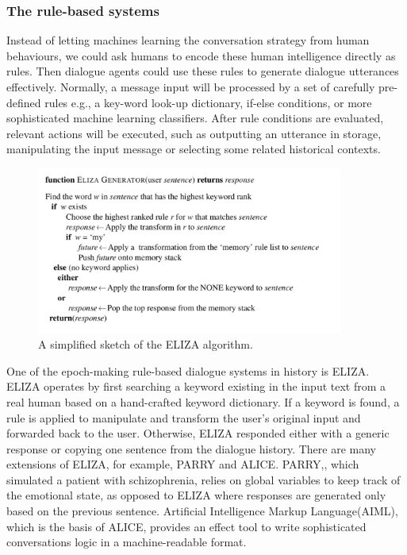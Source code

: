 \documentclass[bsc,frontabs,twoside,singlespacing,parskip,deptreport]{infthesis}     %
\begin{document}
\subsubsection*{The rule-based systems}

Instead of letting machines learning the conversation strategy from human behaviours, we could ask humans to encode these human intelligence directly as rules. Then dialogue agents could use these rules to generate dialogue utterances effectively. Normally, a message input will be processed by a set of carefully pre-defined rules e.g., a key-word look-up dictionary, if-else conditions, or more sophisticated machine learning classifiers. After rule conditions are evaluated, relevant actions will be executed, such as outputting an utterance in storage, manipulating the input message or selecting some related historical contexts.

\begin{figure}[h]
    \centering
    \includegraphics[width=0.9\textwidth]{elizarule.jpeg}
    \caption{A simplified sketch of the ELIZA algorithm.}
    \label{fig:elizarule}
\end{figure}

One of the epoch-making rule-based dialogue systems in history is ELIZA\cite{weizenbaum1966eliza}. ELIZA operates by first searching a keyword existing in the input text from a real human based on a hand-crafted keyword dictionary. If a keyword is found, a rule is applied to manipulate and transform the user’s original input and forwarded back to the user. Otherwise, ELIZA responded either with a generic response or copying one sentence from the dialogue history. There are many extensions of ELIZA, for example, PARRY\cite{parkinson1977conversational} and ALICE\cite{wallace1995artificial}. PARRY,, which simulated a patient with schizophrenia, relies on global variables to keep track of the emotional state, as opposed to ELIZA where responses are generated only based on the previous sentence. Artificial Intelligence Markup Language(AIML), which is the basis of ALICE, provides an effect tool to write sophisticated conversations logic in a machine-readable format.
\end{document}
